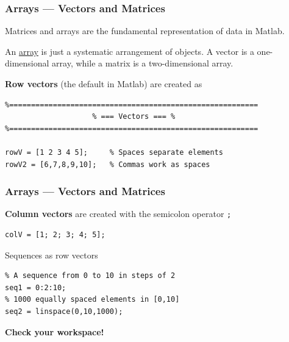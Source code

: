 \documentclass[11pt,xcolor={svgnames},aspectratio=169,usepdftitle=false]{beamer}
\let\toneitemize\itemize
\let\ttwoitemize\enditemize
\renewenvironment{itemize}{\toneitemize\addtolength{\itemsep}{1.35\baselineskip}}{\ttwoitemize}
\begin{document}
\begin{frame}[fragile]
    \frametitle{Arrays --- Vectors and Matrices}
\begin{itemize}
    \item Matrices and arrays are the fundamental representation of data in Matlab.
    \item An \href{https://en.wikipedia.org/wiki/Array}{array} is just a systematic arrangement of objects. A vector is a one-dimensional array, while a matrix is a two-dimensional array.
    \item \alert{\textbf{Row vectors}} (the default in Matlab) are created as
\begin{lstlisting}
%=========================================================
                    % === Vectors === %
%=========================================================

rowV = [1 2 3 4 5];     % Spaces separate elements
rowV2 = [6,7,8,9,10];   % Commas work as spaces
\end{lstlisting}
\end{itemize}
\end{frame}

\begin{frame}[fragile]
    \frametitle{Arrays --- Vectors and Matrices}
\begin{itemize}
    \item \alert{\textbf{Column vectors}} are created with the semicolon operator \verb+;+
\begin{lstlisting}
colV = [1; 2; 3; 4; 5];
\end{lstlisting}
    \item Sequences as row vectors
\begin{lstlisting}
% A sequence from 0 to 10 in steps of 2
seq1 = 0:2:10;
% 1000 equally spaced elements in [0,10]
seq2 = linspace(0,10,1000);
\end{lstlisting}
    \item \alert{\textbf{Check your workspace!}}
\end{itemize}
\end{frame}
\end{document}
